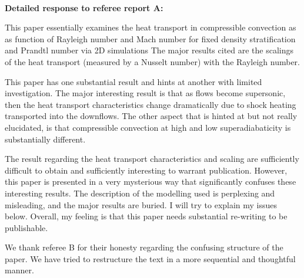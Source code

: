 \documentclass[aps, 11pt, singlecolumn]{revtex4-1} %
\begin{document}
\begin{singlespace}
$\,$
\newline
$\,$
\newline

\textbf{Detailed response to referee report A:}

\begin{myquotation}
This paper essentially examines the heat transport in compressible
convection as as function of Rayleigh number and Mach number for fixed
density stratification and Prandtl number via 2D simulations The major
results cited are the scalings of the heat transport (measured by a
Nusselt number) with the Rayleigh number.

This paper has one substantial result and hints at another with
limited investigation. The major interesting result is that as flows
become supersonic, then the heat transport characteristics change
dramatically due to shock heating transported into the downflows. The
other aspect that is hinted at but not really elucidated, is that
compressible convection at high and low superadiabaticity is
substantially different.

The result regarding the heat transport characteristics and scaling
are sufficiently difficult to obtain and sufficiently interesting to
warrant publication. However, this paper is presented in a very
mysterious way that significantly confuses these interesting results.
The description of the modelling used is perplexing and misleading,
and the major results are buried. I will try to explain my issues
below. Overall, my feeling is that this paper needs substantial
re-writing to be publishable.
\end{myquotation}
We thank referee B for their honesty regarding the confusing
structure of the paper.  We have tried to restructure the text in
a more sequential and thoughtful manner.


\end{singlespace}
\end{document}
